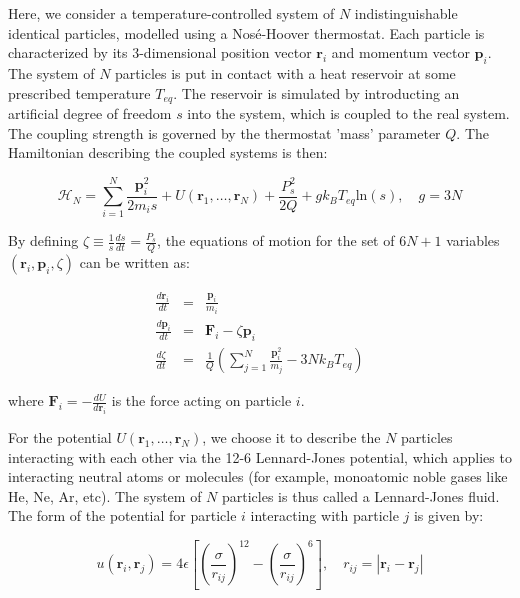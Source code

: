 \documentclass[a4paper,10pt]{article}
\begin{document}
Here, we consider a temperature-controlled system of $N$ indistinguishable identical particles, modelled using a Nos\'{e}-Hoover thermostat. Each particle is characterized by its 3-dimensional position vector $\mathbf{r}_i$ and momentum vector $\mathbf{p}_i$. The system of $N$ particles is put in contact with a heat reservoir at some prescribed temperature $T_{eq}$. The reservoir is simulated by introducting an artificial degree of freedom $s$ into the system, which is coupled to the real system. The coupling strength is governed by the thermostat 'mass' parameter $Q$. The Hamiltonian describing the coupled systems is then:

\begin{equation}
\mathcal{H}_N = \displaystyle\sum_{i=1}^N \frac{\mathbf{p}_i^2}{2m_i s} + U(\mathbf{r}_1,\ldots,\mathbf{r}_N) + \frac{P_s^2}{2Q} + g k_B T_{eq} \mbox{ln}(s), \quad g = 3N
\label{eqn:hamiltonian}
\end{equation}

By defining $\zeta \equiv \frac{1}{s} \frac{ds}{dt} = \frac{P_s}{Q}$, the equations of motion for the set of $6N+1$ variables $(\mathbf{r}_i,\mathbf{p}_i,\zeta)$ can be written as:

\begin{eqnarray}
\frac{d\mathbf{r}_i}{dt} &=& \frac{\mathbf{p}_i}{m_i} \label{eqn:motion1} \\
\frac{d\mathbf{p}_i}{dt} &=& \mathbf{F}_i - \zeta\mathbf{p}_i \label{eqn:motion2} \\
\frac{d\zeta}{dt} &=& \frac{1}{Q} \left( \displaystyle\sum_{j=1}^N \frac{\mathbf{p}_i^2}{m_j} - 3Nk_B T_{eq} \right) \label{eqn:motion3}
\end{eqnarray}

where $\mathbf{F}_i = -\frac{dU}{d\mathbf{r}_i}$ is the force acting on particle $i$.

For the potential $U(\mathbf{r}_1,\ldots,\mathbf{r}_N)$, we choose it to describe the $N$ particles interacting with each other via the 12-6 Lennard-Jones potential, which applies to interacting neutral atoms or molecules (for example, monoatomic noble gases like He, Ne, Ar, etc). The system of $N$ particles is thus called a Lennard-Jones fluid. The form of the potential for particle $i$ interacting with particle $j$ is given by:

\begin{equation}
u(\mathbf{r}_i,\mathbf{r}_j) = 4\epsilon\left[ \left( \frac{\sigma}{r_{ij}} \right)^{12} - \left( \frac{\sigma}{r_{ij}} \right)^6  \right], \quad r_{ij} = |\mathbf{r}_i - \mathbf{r}_j|
\end{equation}
\end{document}
